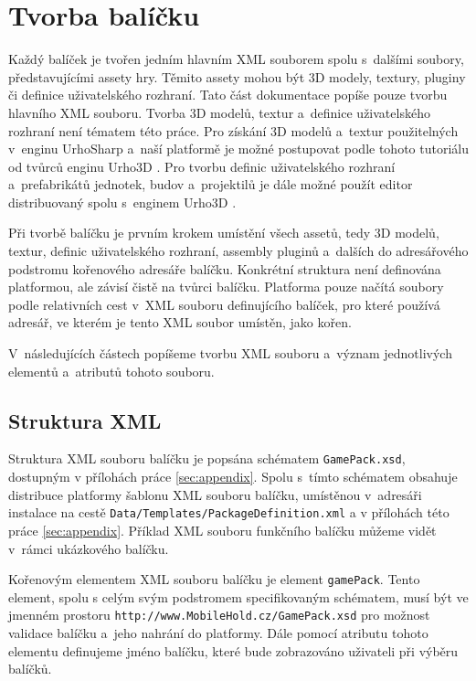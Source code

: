 \chapter{Tvorba balíčku}
\label{sec:packagemaking}
Každý balíček je tvořen jedním hlavním XML souborem spolu s~dalšími soubory, představujícími assety hry. Těmito assety mohou být 3D modely, textury, pluginy či definice uživatelského rozhraní. Tato část dokumentace popíše pouze tvorbu hlavního XML souboru. Tvorba 3D modelů, textur a~definice uživatelského rozhraní není tématem této práce. Pro získání 3D modelů a~textur použitelných v~enginu UrhoSharp a~naší platformě je možné postupovat podle tohoto tutoriálu od tvůrců enginu Urho3D \citep{site:blendertourho3D}. Pro tvorbu definic uživatelského rozhraní a~prefabrikátů jednotek, budov a~projektilů je dále možné použít editor distribuovaný spolu s~enginem Urho3D \citep{site:urho3deditor}.

Při tvorbě balíčku je prvním krokem umístění všech assetů, tedy 3D modelů, textur, definic uživatelského rozhraní, assembly pluginů a~dalších do adresářového podstromu kořenového adresáře balíčku. Konkrétní struktura není definována platformou, ale závisí čistě na tvůrci balíčku. Platforma pouze načítá soubory podle relativních cest v~XML souboru definujícího balíček, pro které používá adresář, ve kterém je tento XML soubor umístěn, jako kořen. 

V~následujících částech popíšeme tvorbu XML souboru a~význam jednotlivých elementů a~atributů tohoto souboru.


\section{Struktura XML}
\label{sec:xmlstructure}
Struktura XML souboru balíčku je popsána schématem \texttt{GamePack.xsd}, dostupným v přílohách práce \ref{sec:appendix}. Spolu s~tímto schématem obsahuje distribuce platformy šablonu XML souboru balíčku, umístěnou v~adresáři instalace na cestě \texttt{Data/Templates/PackageDefinition.xml} a v přílohách této práce \ref{sec:appendix}. Příklad XML souboru funkčního balíčku můžeme vidět v~rámci ukázkového balíčku. 

Kořenovým elementem XML souboru balíčku je element \texttt{gamePack}. Tento element, spolu s celým svým podstromem specifikovaným schématem, musí být ve jmenném prostoru \texttt{http://www.MobileHold.cz/GamePack.xsd} pro možnost validace balíčku a~jeho nahrání do platformy. Dále pomocí atributu tohoto elementu definujeme jméno balíčku, které bude zobrazováno uživateli při výběru balíčků. 

